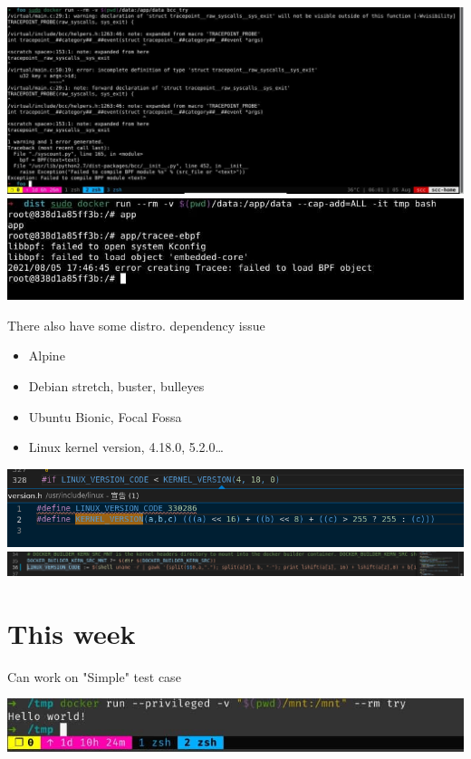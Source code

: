 \documentclass{beamer}
\begin{document}
\begin{CJK*}{UTF8}{bsmi}
  \begin{frame}
    \includegraphics[height=.5\textheight]{photo_2021-08-05_06-02-50.jpg}
    \includegraphics[height=.5\textheight]{photo_2021-08-06_02-08-38.jpg}
  \end{frame}

  \begin{frame}{There also have some distro. dependency issue}
    \begin{itemize}
      \item Alpine
      \item Debian stretch, buster, bulleyes
      \item Ubuntu Bionic, Focal Fossa
      \item Linux kernel version, 4.18.0, 5.2.0\dots
    \end{itemize}
    \includegraphics[width=\textwidth]{Screenshot_2021-08-06_06-44-54.png}
    \includegraphics[width=\textwidth]{Screenshot_2021-08-06_06-46-24.png}
  \end{frame}

  \section{This week}
  \begin{frame}{Can work on "Simple" test case}
    
    \includegraphics[width=\textwidth]{photo_2021-08-13_12-20-31.jpg}
  \end{frame}


\end{CJK*}
\end{document}
